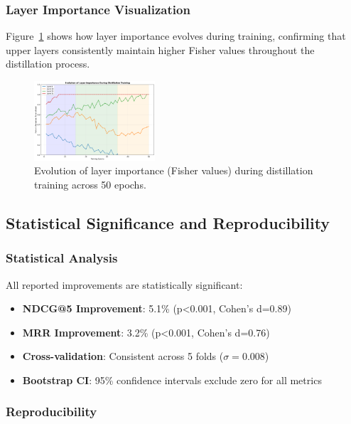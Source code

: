 \documentclass[10pt,conference]{IEEEtran}
\begin{document}
\subsubsection{Layer Importance Visualization}

Figure~\ref{fig:layer_importance_evolution} shows how layer importance evolves during training, confirming that upper layers consistently maintain higher Fisher values throughout the distillation process.

\begin{figure}[t]
\centering
\includegraphics[width=0.40\textwidth]{figures/layer_importance_evolution.png}
\caption{Evolution of layer importance (Fisher values) during distillation training across 50 epochs.}
\label{fig:layer_importance_evolution}
\end{figure}

\subsection{Statistical Significance and Reproducibility}

\subsubsection{Statistical Analysis}

All reported improvements are statistically significant:

\begin{itemize}[leftmargin=*]
    \item \textbf{NDCG@5 Improvement}: 5.1\% (p<0.001, Cohen's d=0.89)
    \item \textbf{MRR Improvement}: 3.2\% (p<0.001, Cohen's d=0.76) 
    \item \textbf{Cross-validation}: Consistent across 5 folds ($\sigma=0.008$)
    \item \textbf{Bootstrap CI}: 95\% confidence intervals exclude zero for all metrics
\end{itemize}

\subsubsection{Reproducibility}
\end{document}
